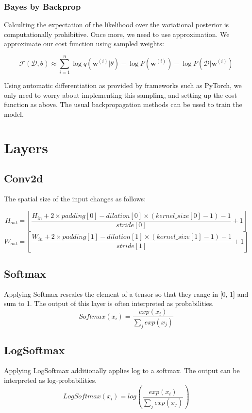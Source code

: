 \subsubsection{Bayes by Backprop}

Calculting the expectation of the likelihood over the variational posterior is computationally prohibitive. Once more, we need to use approximation. We approximate our cost function using sampled weights:

\begin{equation}
    \mathcal{F}(\mathcal{D}, \theta) \approx \sum_{i=1}^n \log q(\mathbf{w}^{(i)}|\theta) - \log P(\mathbf{w}^{(i)}) - \log P(\mathcal{D}|\mathbf{w}^{(i)})
\end{equation} 

Using automatic differentiation as provided by frameworks such as PyTorch, we only need to worry about implementing this sampling, and setting up the cost function as above. The usual backpropagation methods can be used to train the model.

\section{Layers}
\subsection{Conv2d}
The spatial size of the input changes as follows:

\begin{equation}
    H_{out} = \left\lfloor \frac{H_{in}+2\times padding[0] - dilation[0]\times (kernel\_size[0]-1)-1}{stride[0]}+1 \right\rfloor
\end{equation}
\begin{equation}
    W_{out} = \left\lfloor \frac{W_{in}+2\times padding[1]-dilation[1]\times(kernel\_size[1]-1)-1}{stride[1]}+1 \right\rfloor
\end{equation}

\subsection{Softmax}
Applying Softmax rescales the element of a tensor so that they range in [0, 1] and sum to 1. The output of this layer is often interpreted as probabilities.
\begin{equation}
    Softmax(x_i) = \frac{exp(x_i)}{\sum_j exp(x_j)}
\end{equation}

\subsection{LogSoftmax}
Applying LogSoftmax additionally applies log to a softmax. The output can be interpreted as log-probabilities.
\begin{equation}
    LogSoftmax(x_i) = log\left(\frac{exp(x_i)}{\sum_j exp(x_j)}\right)
\end{equation}
